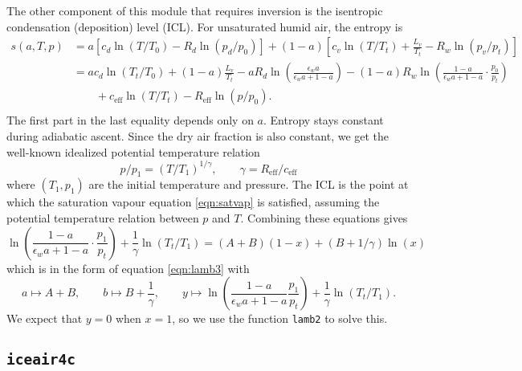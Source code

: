 \documentclass{article}
\newcommand{\eff}{\text{eff}}
\newcommand{\epsw}{\epsilon_w}
\begin{document}
The other component of this module that requires inversion is the isentropic condensation (deposition) level (ICL). For unsaturated humid air, the entropy is
\begin{align*}
    s(a,T,p) &= a \left[ c_d \ln(T/T_0) - R_d \ln(p_d/p_0) \right] + (1-a) \left[ c_v \ln(T/T_t) + \frac{L_v}{T_t} - R_w \ln(p_v/p_t) \right] \\
    &= a c_d \ln(T_t/T_0) + (1-a) \frac{L_v}{T_t} - a R_d \ln\left( \frac{\epsw a}{\epsw a + 1-a} \right) - (1-a) R_w \ln\left( \frac{1-a}{\epsw a + 1-a} \cdot \frac{p_0}{p_t} \right) \\
    &\qquad + c_{\eff} \ln(T/T_t) - R_{\eff} \ln(p/p_0). \\
\end{align*}
The first part in the last equality depends only on $a$. Entropy stays constant during adiabatic ascent. Since the dry air fraction is also constant, we get the well-known idealized potential temperature relation
\begin{equation*}
    p/p_1 = (T/T_1)^{1/\gamma}, \qquad \gamma = R_{\eff}/c_{\eff}
\end{equation*}
where $(T_1,p_1)$ are the initial temperature and pressure. The ICL is the point at which the saturation vapour equation \ref{eqn:satvap} is satisfied, assuming the potential temperature relation between $p$ and $T$. Combining these equations gives
\begin{equation*}
    \ln\left( \frac{1-a}{\epsw a + 1-a} \cdot \frac{p_1}{p_t} \right) + \frac{1}{\gamma}\ln(T_t/T_1) = (A+B) (1-x) + (B + 1/\gamma) \ln(x)
\end{equation*}
which is in the form of equation \ref{eqn:lamb3} with
\begin{equation*}
    a \mapsto A+B, \qquad b \mapsto B + \frac{1}{\gamma}, \qquad y \mapsto \ln\left( \frac{1-a}{\epsw a + 1-a} \frac{p_1}{p_t} \right) + \frac{1}{\gamma} \ln(T_t/T_1).
\end{equation*}
We expect that $y=0$ when $x=1$, so we use the function \texttt{lamb2} to solve this.


\subsection{\texttt{iceair4c}}
\end{document}
